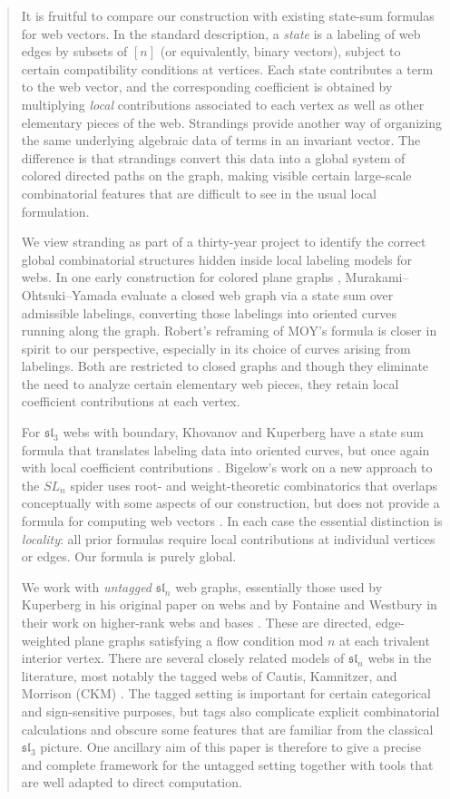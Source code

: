 \documentclass[letterpaper,11pt]{amsart}
\begin{document}
\begin{abstract}
It is fruitful to compare our construction
with existing state-sum formulas for web vectors. In the standard description, a \emph{state} is a labeling of web edges by subsets of $[n]$ (or equivalently, binary vectors), subject to certain compatibility conditions at vertices. Each state contributes a term to the web vector, and the corresponding coefficient is obtained by multiplying \emph{local} contributions associated to  each vertex as well as other elementary pieces of the web. Strandings provide another way of organizing the same underlying algebraic data of terms in an invariant vector. The difference is that strandings convert this data into a global system of colored directed paths on the graph, making visible certain large-scale combinatorial features that are difficult to see in the usual local formulation.
 
We view stranding as part of a thirty-year project to identify the correct 
global combinatorial structures hidden inside local labeling models for webs. In one early construction for colored plane graphs \cite{MOY}, Murakami--Ohtsuki--Yamada evaluate a closed web graph via a state sum over admissible labelings, converting those labelings into oriented curves running along the graph. Robert's reframing of MOY's formula \cite{Robert} is closer in spirit to our perspective, especially in its choice of curves arising from labelings. Both are restricted to closed graphs and though they eliminate the need to analyze certain elementary web pieces, they retain local coefficient contributions at each vertex.
 
For $\mathfrak{sl}_3$ webs with boundary, Khovanov and Kuperberg have a state sum formula that translates labeling data into oriented curves, but once again with local coefficient contributions \cite{KK}. Bigelow's work on a new approach to the $SL_n$ spider uses root- and weight-theoretic combinatorics that overlaps conceptually with some aspects of our construction, but does not provide a formula for computing web vectors \cite{Bigelow}. In each case the essential distinction is \emph{locality}: all prior formulas require local contributions at individual vertices or edges. Our formula is purely global.
 
We work with \emph{untagged} $\mathfrak{sl}_n$ web graphs, essentially those used by Kuperberg in his original paper on webs \cite{KuperbergWebs} and by Fontaine and Westbury in their work on higher-rank webs and bases \cite{FontaineThesis, FON, WestburyBases}. These are directed, edge-weighted plane graphs satisfying a flow condition mod $n$ at each trivalent interior vertex. There are several closely related models of $\mathfrak{sl}_n$ webs in the literature, most notably the tagged webs of Cautis, Kamnitzer, and Morrison (CKM) \cite{CKM}. The tagged setting is important for certain categorical and sign-sensitive purposes, but tags also complicate explicit combinatorial calculations and obscure some features that are familiar from the classical $\mathfrak{sl}_3$ picture. One ancillary aim of this paper is therefore to give a precise and complete framework for the untagged setting together with tools that are well adapted to direct computation.
 

\end{abstract}
\end{document}
